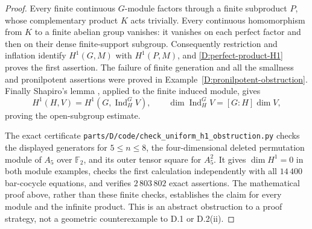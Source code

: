 \begin{proof}
Every finite continuous $G$-module factors through a finite
subproduct $P$, whose complementary product $K$ acts trivially.
Every continuous homomorphism from $K$ to a finite abelian
group vanishes: it vanishes on each perfect factor and then on
their dense finite-support subgroup.  Consequently restriction
and inflation identify $H^1(G,M)$ with $H^1(P,M)$, and
\eqref{D:perfect-product-H1} proves the first assertion.
The failure of finite generation and all the smallness and
pronilpotent assertions were proved in
Example~\ref{D:pronilpotent-obstruction}.  Finally Shapiro's
lemma \cite[II, Proposition 1.11, p.~62, and Proposition 4.2,
p.~87]{MilneCFT2020D}, applied to the finite induced module, gives
\[
 H^1(H,V)=H^1(G,\operatorname{Ind}_H^G V),\qquad
 \dim\operatorname{Ind}_H^G V=[G:H]\dim V,
\]
proving the open-subgroup estimate.

The exact certificate
\nolinkurl{parts/D/code/check_uniform_h1_obstruction.py}
checks the displayed generators for $5\leq n\leq8$, the
four-dimensional deleted permutation module of $A_5$ over
$\mathbb F_2$, and its outer tensor square for $A_5^2$.
It gives $\dim H^1=0$ in both module examples, checks the
first calculation independently with all $14\,400$ bar-cocycle
equations, and verifies $2\,803\,802$ exact assertions.
The mathematical proof above, rather than these finite checks,
establishes the claim for every module and the infinite product.
This is an abstract obstruction to a proof strategy, not a
geometric counterexample to D.1 or D.2(ii).
\end{proof}

